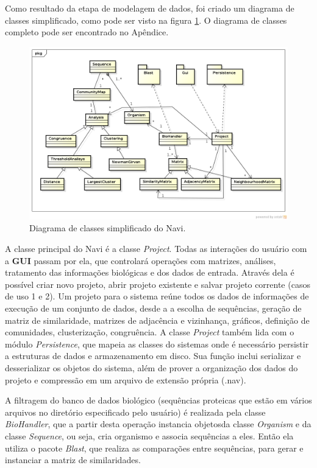 Como resultado da etapa de modelagem de dados, foi criado um diagrama de classes simplificado, como pode ser visto na figura
\ref{fig:diagrama-classes-simplificado}. O diagrama de classes completo pode ser encontrado no Apêndice.

\begin{figure}
\centering
\includegraphics[scale=0.52]{diagrama-classes-simplificado}
\caption{Diagrama de classes simplificado do Navi.}
\label{fig:diagrama-classes-simplificado}
\end{figure}

A classe principal do Navi é a classe \textit{Project}. Todas as interações do usuário com a \textbf{GUI} passam por ela, que controlará operações com
matrizes, análises, tratamento das informações biológicas e dos dados de entrada. Através dela é possível criar novo projeto, abrir projeto existente e
salvar projeto corrente (casos de uso 1 e 2). Um projeto para o sistema reúne todos os dados de informações de execução de um conjunto de dados, desde a
a escolha de sequências, geração de matriz de similaridade, matrizes de adjacência e vizinhança, gráficos, definição de comunidades, clusterização,
congruência. A classe \textit{Project} também lida com o módulo \textit{Persistence}, que mapeia as classes do sistemas onde é necessário
persistir a estruturas de dados e armazenamento em disco. Sua função inclui serializar e desserializar os objetos do sistema, além de prover
a organização dos dados do projeto e compressão em um arquivo de extensão própria (.nav).


A filtragem do banco de dados biológico (sequências proteicas que estão em vários arquivos no diretório especificado pelo usuário) é realizada pela classe
\textit{BioHandler}, que a partir desta operação instancia objetosda classe \textit{Organism} e da classe \textit{Sequence}, ou seja, cria organismo e associa
sequências a eles. Então ela utiliza o pacote \textit{Blast}, que realiza as comparações entre sequências, para gerar e instanciar a matriz de similaridades.

